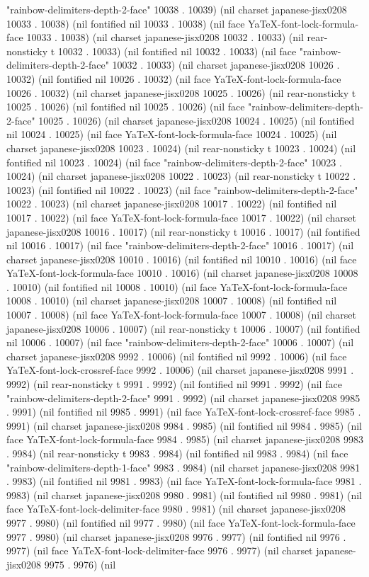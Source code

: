 "rainbow-delimiters-depth-2-face" 10038 . 10039) (nil charset japanese-jisx0208 10033 . 10038) (nil fontified nil 10033 . 10038) (nil face YaTeX-font-lock-formula-face 10033 . 10038) (nil charset japanese-jisx0208 10032 . 10033) (nil rear-nonsticky t 10032 . 10033) (nil fontified nil 10032 . 10033) (nil face "rainbow-delimiters-depth-2-face" 10032 . 10033) (nil charset japanese-jisx0208 10026 . 10032) (nil fontified nil 10026 . 10032) (nil face YaTeX-font-lock-formula-face 10026 . 10032) (nil charset japanese-jisx0208 10025 . 10026) (nil rear-nonsticky t 10025 . 10026) (nil fontified nil 10025 . 10026) (nil face "rainbow-delimiters-depth-2-face" 10025 . 10026) (nil charset japanese-jisx0208 10024 . 10025) (nil fontified nil 10024 . 10025) (nil face YaTeX-font-lock-formula-face 10024 . 10025) (nil charset japanese-jisx0208 10023 . 10024) (nil rear-nonsticky t 10023 . 10024) (nil fontified nil 10023 . 10024) (nil face "rainbow-delimiters-depth-2-face" 10023 . 10024) (nil charset japanese-jisx0208 10022 . 10023) (nil rear-nonsticky t 10022 . 10023) (nil fontified nil 10022 . 10023) (nil face "rainbow-delimiters-depth-2-face" 10022 . 10023) (nil charset japanese-jisx0208 10017 . 10022) (nil fontified nil 10017 . 10022) (nil face YaTeX-font-lock-formula-face 10017 . 10022) (nil charset japanese-jisx0208 10016 . 10017) (nil rear-nonsticky t 10016 . 10017) (nil fontified nil 10016 . 10017) (nil face "rainbow-delimiters-depth-2-face" 10016 . 10017) (nil charset japanese-jisx0208 10010 . 10016) (nil fontified nil 10010 . 10016) (nil face YaTeX-font-lock-formula-face 10010 . 10016) (nil charset japanese-jisx0208 10008 . 10010) (nil fontified nil 10008 . 10010) (nil face YaTeX-font-lock-formula-face 10008 . 10010) (nil charset japanese-jisx0208 10007 . 10008) (nil fontified nil 10007 . 10008) (nil face YaTeX-font-lock-formula-face 10007 . 10008) (nil charset japanese-jisx0208 10006 . 10007) (nil rear-nonsticky t 10006 . 10007) (nil fontified nil 10006 . 10007) (nil face "rainbow-delimiters-depth-2-face" 10006 . 10007) (nil charset japanese-jisx0208 9992 . 10006) (nil fontified nil 9992 . 10006) (nil face YaTeX-font-lock-crossref-face 9992 . 10006) (nil charset japanese-jisx0208 9991 . 9992) (nil rear-nonsticky t 9991 . 9992) (nil fontified nil 9991 . 9992) (nil face "rainbow-delimiters-depth-2-face" 9991 . 9992) (nil charset japanese-jisx0208 9985 . 9991) (nil fontified nil 9985 . 9991) (nil face YaTeX-font-lock-crossref-face 9985 . 9991) (nil charset japanese-jisx0208 9984 . 9985) (nil fontified nil 9984 . 9985) (nil face YaTeX-font-lock-formula-face 9984 . 9985) (nil charset japanese-jisx0208 9983 . 9984) (nil rear-nonsticky t 9983 . 9984) (nil fontified nil 9983 . 9984) (nil face "rainbow-delimiters-depth-1-face" 9983 . 9984) (nil charset japanese-jisx0208 9981 . 9983) (nil fontified nil 9981 . 9983) (nil face YaTeX-font-lock-formula-face 9981 . 9983) (nil charset japanese-jisx0208 9980 . 9981) (nil fontified nil 9980 . 9981) (nil face YaTeX-font-lock-delimiter-face 9980 . 9981) (nil charset japanese-jisx0208 9977 . 9980) (nil fontified nil 9977 . 9980) (nil face YaTeX-font-lock-formula-face 9977 . 9980) (nil charset japanese-jisx0208 9976 . 9977) (nil fontified nil 9976 . 9977) (nil face YaTeX-font-lock-delimiter-face 9976 . 9977) (nil charset japanese-jisx0208 9975 . 9976) (nil 